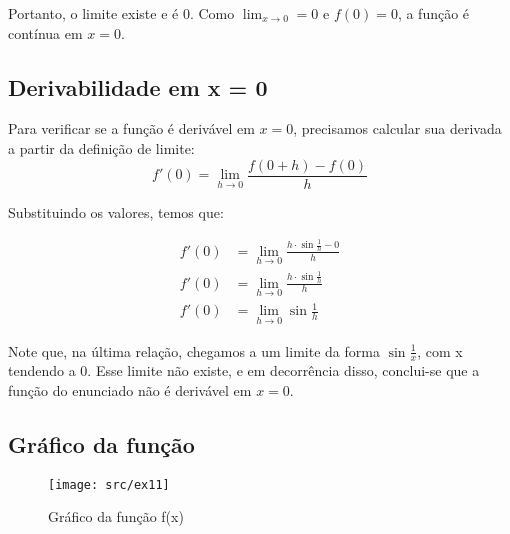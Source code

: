 \documentclass[../resumo.tex]{subfiles}
\begin{document}
	Portanto, o limite existe e é 0. Como $\lim_{x\to0} = 0$ e $f(0) = 0$, a função é contínua em $x = 0$.



	\subsection{Derivabilidade em x = 0}

	Para verificar se a função é derivável em $x = 0$, precisamos calcular sua derivada a partir da definição
	de limite:
	\[f'(0) = \lim_{h\to0} \frac{f(0 + h) - f(0)}{h}\]

	Substituindo os valores, temos que:

	\begin{align*}
			f'(0) &= \lim_{h\to0} \frac{h\cdot\sin{\frac{1}{h}} - 0}{h} \\
			f'(0) &= \lim_{h\to0} \frac{h\cdot\sin{\frac{1}{h}}}{h} \\
			f'(0) &= \lim_{h\to0} \sin{\frac{1}{h}}
	\end{align*}

	Note que, na última relação, chegamos a um limite da forma $\sin{\frac{1}{x}}$, com x tendendo a 0.
	Esse limite não existe, e em decorrência disso, conclui-se que a função do enunciado não é derivável em
	 $x = 0$.


 \subsection{Gráfico da função}

 \begin{figure}[H]
    \centering
    \texttt{[image: src/ex11]}
    \caption{Gráfico da função f(x)}
 \end{figure}
\end{document}
